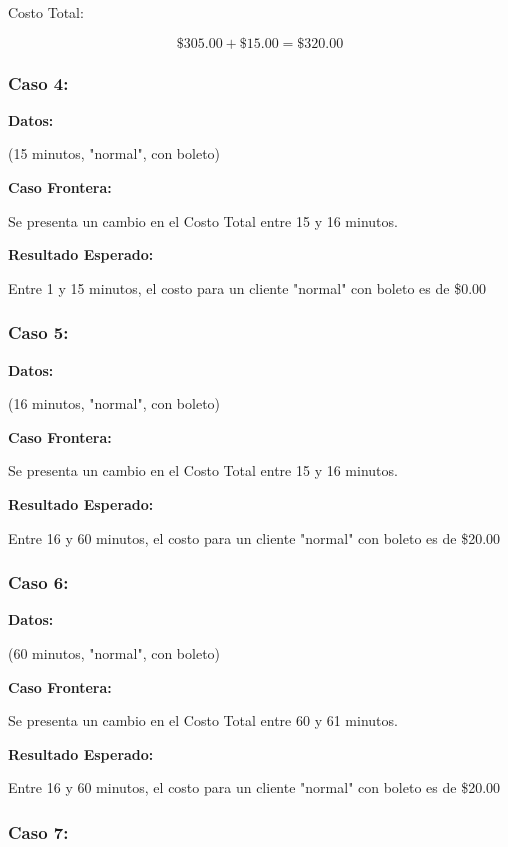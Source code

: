 \documentclass[11pt,letterpaper]{article}
\begin{document}
Costo Total:

\[
   \text{\$}305.00 + \text{\$}15.00 = \text{\$}320.00
\]


\subsubsection{Caso 4:}
\label{sec:org2b56be5}

\textbf{Datos:}

(15 minutos, "normal", con boleto)

\textbf{Caso Frontera:}

Se presenta un cambio en el Costo Total entre 15 y 16 minutos.

\textbf{Resultado Esperado:}

Entre 1 y 15 minutos, el costo para un cliente "normal" con boleto es de \$0.00


\subsubsection{Caso 5:}
\label{sec:org5f3d51c}

\textbf{Datos:}

(16 minutos, "normal", con boleto)

\textbf{Caso Frontera:}

Se presenta un cambio en el Costo Total entre 15 y 16 minutos.

\textbf{Resultado Esperado:}

Entre 16 y 60 minutos, el costo para un cliente "normal" con boleto es de \$20.00


\subsubsection{Caso 6:}
\label{sec:orgcafce0b}

\textbf{Datos:}

(60 minutos, "normal", con boleto)

\textbf{Caso Frontera:}

Se presenta un cambio en el Costo Total entre 60 y 61 minutos.

\textbf{Resultado Esperado:}

Entre 16 y 60 minutos, el costo para un cliente "normal" con boleto es de \$20.00


\subsubsection{Caso 7:}
\label{sec:orgf60a7bc}
\end{document}
